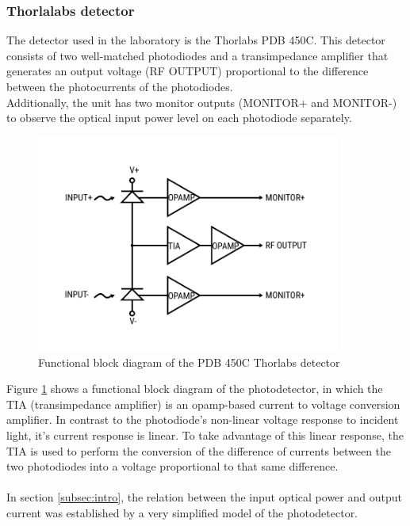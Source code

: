 \subsubsection{Thorlalabs detector}
%
The detector used in the laboratory is the Thorlabs PDB 450C. This detector consists of two well-matched photodiodes and a transimpedance amplifier that generates an output voltage (RF OUTPUT) proportional to the difference between the photocurrents of the photodiodes.\\
Additionally, the unit has two monitor outputs (MONITOR+ and MONITOR-) to observe the optical input power level on each photodiode separately.
\cite{thorlabs}
%
\begin{figure}[H]
	\centering
	\includegraphics[width=10cm]{./sdf/optical_detection/figures/thorlabs-circuit.pdf}
	\caption{Functional block diagram of the PDB 450C Thorlabs detector \cite{thorlabs}}
	\label{fig:photodetector-circuit}
\end{figure}
%
\noindent
Figure \ref{fig:photodetector-circuit} shows a functional block diagram of the photodetector, in which the TIA (transimpedance amplifier) is an opamp-based current to voltage conversion amplifier.
In contrast to the photodiode's non-linear voltage response to incident light, it's current response is linear.
To take advantage of this linear response, the TIA is used to perform the conversion of the difference of currents between the two photodiodes into a voltage proportional to that same difference.\\
%
\\
In section \ref{subsec:intro}, the relation between the input optical power and output current was established by a very simplified model of the photodetector.
%
